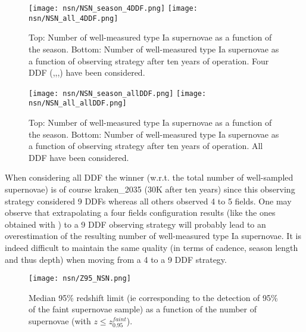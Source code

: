\begin{figure}[htbp]
\begin{center}
  
  \texttt{[image: nsn/NSN\_season\_4DDF.png]}
  \texttt{[image: nsn/NSN\_all\_4DDF.png]}
 \caption{Top: Number of well-measured type Ia supernovae as a function of the season. Bottom: Number of  well-measured type Ia supernovae as a function of observing strategy after ten years of operation. Four DDF (\cosmos,\xmmlss,\cdfs,\elais) have been considered.}\label{fig:nsn_four}
\end{center}
\end{figure}

\begin{figure}[htbp]
\begin{center}
  
  \texttt{[image: nsn/NSN\_season\_allDDF.png]}
  \texttt{[image: nsn/NSN\_all\_allDDF.png]}
 \caption{Top: Number of well-measured type Ia supernovae as a function of the season. Bottom: Number of  well-measured type Ia supernovae as a function of observing strategy after ten years of operation. All DDF have been considered.}\label{fig:nsn_all}
\end{center}
\end{figure}


When considering all DDF the winner (w.r.t. the total number of well-sampled supernovae) is of course kraken\_2035 (30K after ten years) since this observing strategy considered 9 DDFs whereas all others observed 4 to 5 fields. One may observe that extrapolating a four fields configuration results (like the ones obtained with \feature) to a 9 DDF observing strategy will probably lead to an overestimation of the resulting number of well-measured type Ia supernovae. It is indeed difficult to maintain the same quality (in terms of cadence, season length and thus depth) when moving from a 4 to a 9 DDF strategy.

\begin{sidewaysfigure}
\begin{center}  
  \texttt{[image: nsn/Z95\_NSN.png]}
 \caption{Median 95\% redshift limit (ie corresponding to the detection of 95\% of the faint supernovae sample) as a function of the number of supernovae (with $z\leq z_{0.95}^{faint}$).}\label{fig:z95}
\end{center}
\end{sidewaysfigure}

